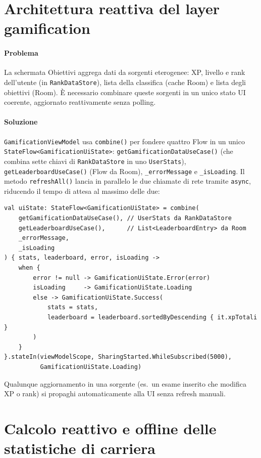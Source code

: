 \documentclass[a4paper,12pt]{report}
\begin{document}
    \section{Architettura reattiva del layer gamification}

    \paragraph{Problema}
    La schermata Obiettivi aggrega dati da sorgenti eterogenee: XP, livello e rank
    dell'utente (in \texttt{RankDataStore}), lista della classifica (cache Room) e
    lista degli obiettivi (Room). È necessario combinare queste sorgenti in un unico
    stato UI coerente, aggiornato reattivamente senza polling.

    \paragraph{Soluzione}
    \texttt{GamificationViewModel} usa \texttt{combine()} per fondere quattro Flow in
    un unico \texttt{StateFlow<GamificationUiState>}: \texttt{getGamificationDataUseCase()}
    (che combina sette chiavi di \texttt{RankDataStore} in uno \texttt{UserStats}),
    \texttt{getLeaderboardUseCase()} (Flow da Room), \texttt{\_errorMessage} e
    \texttt{\_isLoading}. Il metodo \texttt{refreshAll()} lancia in parallelo le due
    chiamate di rete tramite \texttt{async}, riducendo il tempo di attesa al massimo
    delle due:

    \begin{lstlisting}
val uiState: StateFlow<GamificationUiState> = combine(
    getGamificationDataUseCase(), // UserStats da RankDataStore
    getLeaderboardUseCase(),      // List<LeaderboardEntry> da Room
    _errorMessage,
    _isLoading
) { stats, leaderboard, error, isLoading ->
    when {
        error != null -> GamificationUiState.Error(error)
        isLoading     -> GamificationUiState.Loading
        else -> GamificationUiState.Success(
            stats = stats,
            leaderboard = leaderboard.sortedByDescending { it.xpTotali }
        )
    }
}.stateIn(viewModelScope, SharingStarted.WhileSubscribed(5000),
          GamificationUiState.Loading)
    \end{lstlisting}

    Qualunque aggiornamento in una sorgente (es.\ un esame inserito che modifica XP
    o rank) si propaghi automaticamente alla UI senza refresh manuali.

    \section{Calcolo reattivo e offline delle statistiche di carriera}
\end{document}
